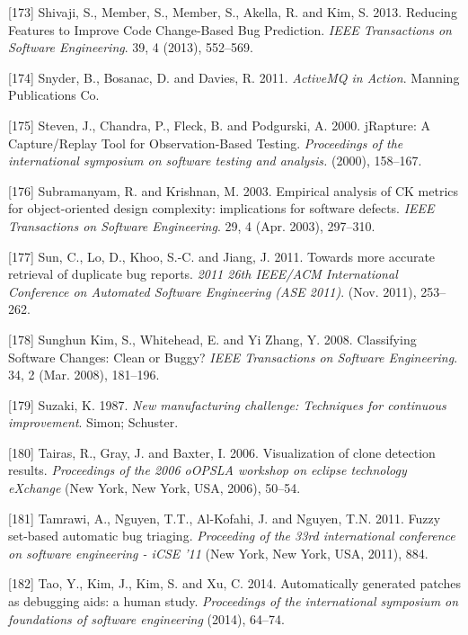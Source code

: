 \documentclass[12pt]{report}
\begin{document}
\hypertarget{ref-Shivaji2013}{}
{[}173{]} Shivaji, S., Member, S., Member, S., Akella, R. and Kim, S.
2013. Reducing Features to Improve Code Change-Based Bug Prediction.
\emph{IEEE Transactions on Software Engineering}. 39, 4 (2013),
552--569.

\hypertarget{ref-snyder2011activemq}{}
{[}174{]} Snyder, B., Bosanac, D. and Davies, R. 2011. \emph{ActiveMQ in
Action}. Manning Publications Co.

\hypertarget{ref-Steven2000}{}
{[}175{]} Steven, J., Chandra, P., Fleck, B. and Podgurski, A. 2000.
jRapture: A Capture/Replay Tool for Observation-Based Testing.
\emph{Proceedings of the international symposium on software testing and
analysis.} (2000), 158--167.

\hypertarget{ref-Subramanyam2003}{}
{[}176{]} Subramanyam, R. and Krishnan, M. 2003. Empirical analysis of
CK metrics for object-oriented design complexity: implications for
software defects. \emph{IEEE Transactions on Software Engineering}. 29,
4 (Apr. 2003), 297--310.

\hypertarget{ref-Sun2011}{}
{[}177{]} Sun, C., Lo, D., Khoo, S.-C. and Jiang, J. 2011. Towards more
accurate retrieval of duplicate bug reports. \emph{2011 26th IEEE/ACM
International Conference on Automated Software Engineering (ASE 2011)}.
(Nov. 2011), 253--262.

\hypertarget{ref-SunghunKim2008}{}
{[}178{]} Sunghun Kim, S., Whitehead, E. and Yi Zhang, Y. 2008.
Classifying Software Changes: Clean or Buggy? \emph{IEEE Transactions on
Software Engineering}. 34, 2 (Mar. 2008), 181--196.

\hypertarget{ref-suzaki1987new}{}
{[}179{]} Suzaki, K. 1987. \emph{New manufacturing challenge: Techniques
for continuous improvement}. Simon; Schuster.

\hypertarget{ref-Tairas2006a}{}
{[}180{]} Tairas, R., Gray, J. and Baxter, I. 2006. Visualization of
clone detection results. \emph{Proceedings of the 2006 oOPSLA workshop
on eclipse technology eXchange} (New York, New York, USA, 2006), 50--54.

\hypertarget{ref-Tamrawi2011a}{}
{[}181{]} Tamrawi, A., Nguyen, T.T., Al-Kofahi, J. and Nguyen, T.N.
2011. Fuzzy set-based automatic bug triaging. \emph{Proceeding of the
33rd international conference on software engineering - iCSE '11} (New
York, New York, USA, 2011), 884.

\hypertarget{ref-tao2014automatically}{}
{[}182{]} Tao, Y., Kim, J., Kim, S. and Xu, C. 2014. Automatically
generated patches as debugging aids: a human study. \emph{Proceedings of
the international symposium on foundations of software engineering}
(2014), 64--74.
\end{document}
